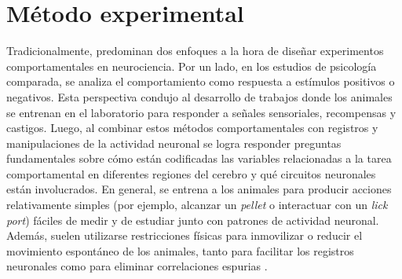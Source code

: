 \chapter{Método experimental}\label{cha:metodo_experimental}



\clearpage

Tradicionalmente, predominan dos enfoques a la hora de diseñar experimentos comportamentales en neurociencia. Por un lado, en los estudios de psicología comparada, se analiza el comportamiento como respuesta a estímulos positivos o negativos. Esta perspectiva condujo al desarrollo de trabajos donde los animales se entrenan en el laboratorio para responder a señales sensoriales, recompensas y castigos. Luego, al combinar estos métodos comportamentales con registros y manipulaciones de la actividad neuronal se logra responder preguntas fundamentales sobre cómo están codificadas las variables relacionadas a la tarea comportamental en diferentes regiones del cerebro y qué circuitos neuronales están involucrados. En general, se entrena a los animales para producir acciones relativamente simples (por ejemplo, alcanzar un \textit{pellet} o interactuar con un \textit{lick port}) fáciles de medir y de estudiar junto con patrones de actividad neuronal. Además, suelen utilizarse restricciones físicas para inmovilizar o reducir el movimiento espontáneo de los animales, tanto para facilitar los registros neuronales como para eliminar correlaciones espurias \cite{datta_computational_neuroethology}.


